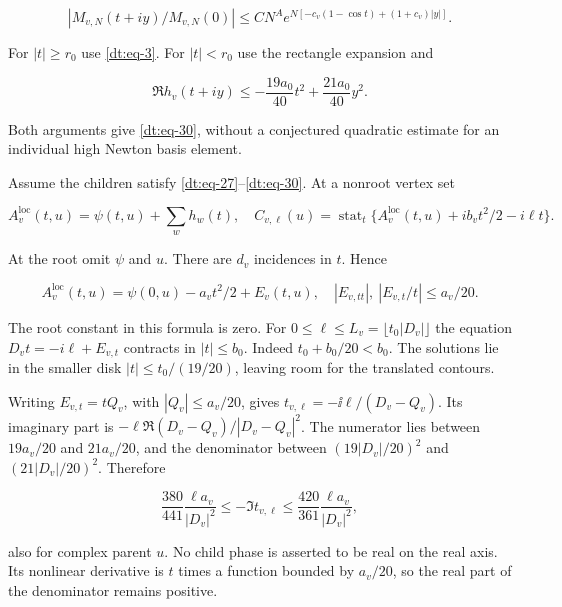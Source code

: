 \begin{equation}\label{dt:eq-31}
|M_{v,N}(t+iy)/M_{v,N}(0)|
 \le CN^A e^{N[-c_v(1-\cos t)+(1+c_v)|y|]}.
\end{equation}

For \(|t|\ge r_0\) use \eqref{dt:eq-3}. For \(|t|<r_0\) use the rectangle expansion and

\begin{equation}\label{dt:eq-32}
\Re h_v(t+iy)\le
       -\frac{19a_0}{40}t^2+\frac{21a_0}{40}y^2.
\end{equation}

Both arguments give \eqref{dt:eq-30}, without a conjectured quadratic estimate for
an individual high Newton basis element.

Assume the children satisfy \eqref{dt:eq-27}--\eqref{dt:eq-30}. At a nonroot vertex set

\begin{equation}\label{dt:eq-33}
A_v^{\mathrm{loc}}(t,u)=\psi(t,u)+\sum_wh_w(t),
 \quad
 C_{v,\ell}(u)=\operatorname{stat}_t
       \{A_v^{\mathrm{loc}}(t,u)+ib_vt^2/2-i\ell t\}.
\end{equation}

At the root omit \(\psi\) and \(u\). There are \(d_v\) incidences in \(t\). Hence

\begin{equation}\label{dt:eq-34}
A_v^{\mathrm{loc}}(t,u)=\psi(0,u)-a_vt^2/2+E_v(t,u),
       \quad |E_{v,tt}|,\ |E_{v,t}/t|\le a_v/20.
\end{equation}

The root constant in this formula is zero. For \(0\le\ell\le L_v=\lfloor t_0|D_v|\rfloor\)
the equation \(D_vt=-i\ell+E_{v,t}\) contracts in \(|t|\le b_0\). Indeed
\(t_0+b_0/20<b_0\). The solutions lie in the smaller disk
\(|t|\le t_0/(19/20)\), leaving room for the translated contours.

Writing \(E_{v,t}=tQ_v\), with \(|Q_v|\le a_v/20\), gives
\(t_{v,\ell}=-\ii\ell/(D_v-Q_v)\). Its imaginary part is
\(-\ell\Re(D_v-Q_v)/|D_v-Q_v|^2\). The numerator lies
between \(19a_v/20\) and \(21a_v/20\), and the denominator
between \((19|D_v|/20)^2\) and \((21|D_v|/20)^2\).
Therefore

\begin{equation}\label{dt:eq-35}
\frac{380}{441}\frac{\ell a_v}{|D_v|^2}
 \le-\Im t_{v,\ell}\le
 \frac{420}{361}\frac{\ell a_v}{|D_v|^2},
\end{equation}

also for complex parent \(u\). No child phase is asserted to be real on
the real axis. Its nonlinear derivative is \(t\) times a function bounded
by \(a_v/20\), so the real part of the denominator remains positive.

